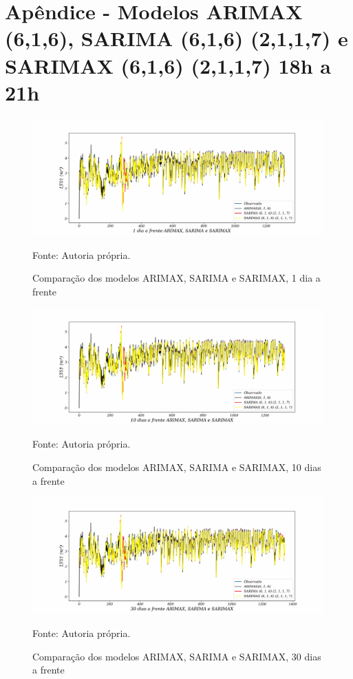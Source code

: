 
\section{Ap\^endice - Modelos ARIMAX (6,1,6), SARIMA (6,1,6) (2,1,1,7) e SARIMAX (6,1,6) (2,1,1,7) 18h a 21h}\label{sec:arimaxsarimasarimax18}

\begin{figure}[H]
	\centering
	\caption{Comparação dos modelos ARIMAX, SARIMA e SARIMAX, 1 dia a frente }
	\label{fig:1-ARIMAX-SARIMA-SARIMAX}
	\includegraphics[width=1\linewidth]{Apendices/Figuras/modelagem-18-a-21h/1-ARIMAX-SARIMA-SARIMAX}
	
	Fonte: Autoria própria.
\end{figure}

\begin{figure}[H]
	\centering
	\caption{Comparação dos modelos ARIMAX, SARIMA e SARIMAX, 10 dias a frente }
	\label{fig:10-ARIMAX-SARIMA-SARIMAX}
	\includegraphics[width=1\linewidth]{Apendices/Figuras/modelagem-18-a-21h/10-ARIMAX-SARIMA-SARIMAX}
	
	Fonte: Autoria própria.
\end{figure}


\begin{figure}[H]
	\centering
	\caption{Comparação dos modelos ARIMAX, SARIMA e SARIMAX, 30 dias a frente }
	\label{fig:30-ARIMAX-SARIMA-SARIMAX}
	\includegraphics[width=1\linewidth]{Apendices/Figuras/modelagem-18-a-21h/30-ARIMAX-SARIMA-SARIMAX}
	
	Fonte: Autoria própria.
\end{figure}

